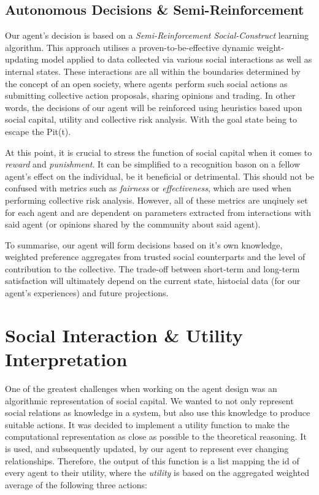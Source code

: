         
        
    \subsection{Autonomous Decisions \& Semi-Reinforcement}

        Our agent's decision is based on a \textit{Semi-Reinforcement Social-Construct} learning algorithm. This approach utilises a proven-to-be-effective dynamic weight-updating model applied to data collected via various social interactions as well as internal states. These interactions are all within the boundaries determined by the concept of an open society, where agents perform such social actions as submitting collective action proposals, sharing opinions and trading. In other words, the decisions of our agent will be reinforced using heuristics based upon social capital, utility and collective risk analysis. With the goal state being to escape the Pit(t). 

        
        At this point, it is crucial to stress the function of social capital when it comes to \textit{reward} and \textit{punishment}. It can be simplified to a recognition bason on a fellow agent's effect on the individual, be it beneficial or detrimental. This should not be confused with metrics such as \textit{fairness} or \textit{effectiveness}, which are used when performing collective risk analysis. However, all of these metrics are unqiuely set for each agent and are dependent on parameters extracted from interactions with said agent (or opinions shared by the community about said agent). 

        To summarise, our agent will form decisions based on it's own knowledge, weighted preference aggregates from trusted social counterparts and the level of contribution to the collective. The trade-off between short-term and long-term satisfaction will ultimately depend on the current state, histocial data (for our agent's experiences) and future projections.  

\section{Social Interaction \& Utility Interpretation}

One of the greatest challenges when working on the agent design was an algorithmic representation of social capital. We wanted to not only represent social relations as knowledge in a system, but also use this knowledge to produce suitable actions. It was decided to implement a utility function to make the computational representation as close as possible to the theoretical reasoning. It is used, and subsequently updated, by our agent to represent ever changing relationships. Therefore, the output of this function is a list mapping the id of every agent to their utility, where the \textit{utility} is based on the aggregated weighted average of the following three actions:
        
